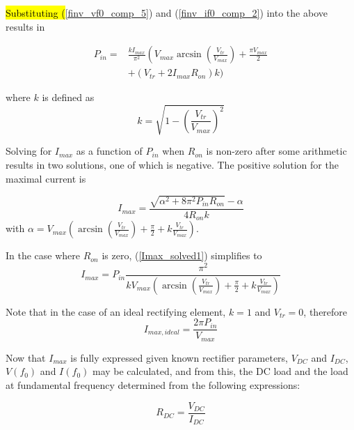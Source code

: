 \hl{Substituting (}\ref{finv_vf0_comp_5}) and (\ref{finv_if0_comp_2}) into the above results in

\begin{shaded}
\begin{equation}\begin{split}\label{Pin_diode2}
    P_{in} =& \frac{kI_{max}}{\pi^2}\left(V_{max}\arcsin\left(\frac{V_{tr}}{V_{max}}\right) + \frac{\pi V_{max}}{2} \right. \\
   &+ \left(V_{tr}+2I_{max}R_{on}\right)k\bigg)
\end{split}\end{equation}
\end{shaded}
where $k$ is defined as
\begin{equation}\label{k}
    k = \sqrt{1 - \left(\frac{V_{tr}}{V_{max}}\right)^2}
\end{equation}

Solving for $I_{max}$ as a function of $P_{in}$ when $R_{on}$ is non-zero after some arithmetic results in two solutions, one of which is negative. The positive solution for the maximal current is

\begin{equation}\label{Imax_solved1}
    I_{max} = \frac{ \sqrt{\alpha^2 + 8\pi^2P_{in}R_{on}}-\alpha}{4R_{on}k}
\end{equation}
with $\alpha=V_{max}\left(\arcsin\left(\frac{V_{tr}}{V_{max}}\right)+ \frac{\pi}{2} + k\frac{V_{tr}}{V_{max}}\right)$.

In the case where $R_{on}$ is zero, (\ref{Imax_solved1}) simplifies to
\begin{equation}\label{Imax_solve_zeroron_solved}
    I_{max} = P_{in}\frac{\pi^2}{kV_{max}\left(\arcsin\left(\frac{V_{tr}}{V_{max}}\right)+ \frac{\pi}{2} + k\frac{V_{tr}}{V_{max}}\right)}
\end{equation}

Note that in the case of an ideal rectifying element, $k = 1$ and $V_{tr} = 0$, therefore
\begin{equation}\label{Imax_solve_zeroron_solved_ideal}
    I_{max,ideal} = \frac{2\pi P_{in}}{V_{max}}
\end{equation}

Now that $I_{max}$ is fully expressed given known rectifier parameters, $V_{DC}$ and $I_{DC}$, $V(f_0)$ and $I(f_0)$ may be calculated, and from this, the DC load and the load at fundamental frequency determined from the following expressions:

\begin{equation}\label{rdcf}
    R_{DC} = \frac{V_{DC}}{I_{DC}}
\end{equation}

